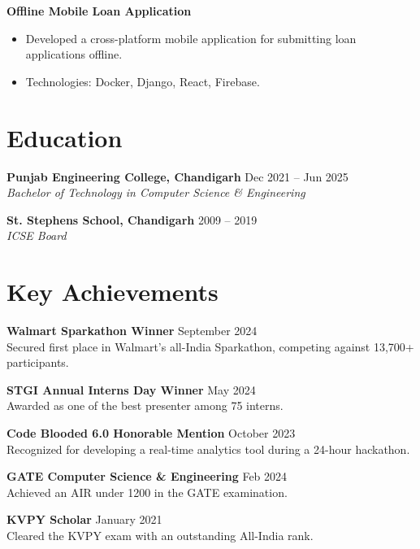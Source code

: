 \documentclass[a4paper,10pt]{article}
\begin{document}
\vspace{-1mm}
\textbf{Offline Mobile Loan Application} \hfill  \\
\vspace{-5mm}
\begin{itemize}[noitemsep]
    \item Developed a cross-platform mobile application for submitting loan applications offline.
    \item Technologies: Docker, Django, React, Firebase.
\end{itemize}

\vspace{-1mm}
\section*{Education}

\textbf{Punjab Engineering College, Chandigarh} \hfill Dec 2021 – Jun 2025 \\
\textit{Bachelor of Technology in Computer Science \& Engineering}

\vspace{-1mm}
\textbf{St. Stephens School, Chandigarh} \hfill 2009 – 2019 \\
\textit{ICSE Board}

\vspace{-1mm}
\section*{Key Achievements}

\textbf{Walmart Sparkathon Winner} \hfill September 2024 \\
Secured first place in Walmart’s all-India Sparkathon, competing against 13,700+ participants.

\vspace{-1mm}
\textbf{STGI Annual Interns Day Winner} \hfill May 2024 \\
Awarded as one of the best presenter among 75 interns.

\vspace{-1mm}
\textbf{Code Blooded 6.0 Honorable Mention} \hfill October 2023 \\
Recognized for developing a real-time analytics tool during a 24-hour hackathon.

\vspace{-1mm}
\textbf{GATE Computer Science \& Engineering} \hfill Feb 2024 \\
Achieved an AIR under 1200 in the GATE examination.

\vspace{-1mm}
\textbf{KVPY Scholar} \hfill  January 2021 \\
Cleared the KVPY exam with an outstanding All-India rank.
\end{document}
